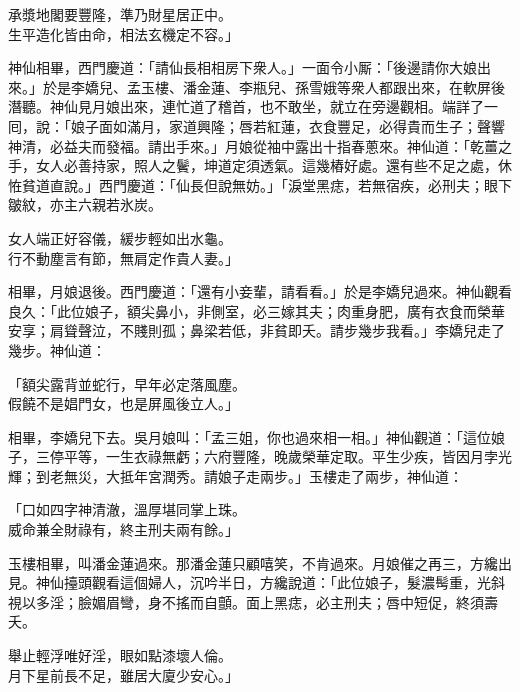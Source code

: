 \begin{myquote}
承漿地閣要豐隆，準乃財星居正中。\\生平造化皆由命，相法玄機定不容。」
\end{myquote}

神仙相畢，西門慶道：「請仙長相相房下衆人。」一面令小厮：「後邊請你大娘出來。」於是李嬌兒、孟玉樓、潘金蓮、李瓶兒、孫雪娥等衆人都跟出來，在軟屏後潛聽。神仙見月娘出來，連忙道了稽首，也不敢坐，就立在旁邊觀相。端詳了一囘，說：「娘子面如滿月，家道興隆；唇若紅蓮，衣食豐足，必得貴而生子；聲響神清，必益夫而發福。請出手來。」月娘從袖中露出十指春蔥來。神仙道：「乾薑之手，女人必善持家，照人之鬢，坤道定須透氣。這幾樁好處。還有些不足之處，休恠貧道直說。」西門慶道：「仙長但說無妨。」「淚堂黑痣，若無宿疾，必刑夫；眼下皺紋，亦主六親若氷炭。

\begin{myquote}
女人端正好容儀，緩步輕如出水龜。\\行不動塵言有節，無肩定作貴人妻。」
\end{myquote}

相畢，月娘退後。西門慶道：「還有小妾輩，請看看。」於是李嬌兒過來。神仙觀看良久：「此位娘子，額尖鼻小，非側室，必三嫁其夫；肉重身肥，廣有衣食而榮華安享；肩聳聲泣，不賤則孤；鼻梁若低，非貧即夭。{}請步幾步我看。」李嬌兒走了幾步。神仙道：

\begin{myquote}
「額尖露背並蛇行，早年必定落風塵。\\假饒不是娼門女，也是屏風後立人。」
\end{myquote}

相畢，李嬌兒下去。吳月娘叫：「孟三姐，你也過來相一相。」神仙觀道：「這位娘子，三停平等，一生衣祿無虧；六府豐隆，晚歲榮華定取。平生少疾，皆因月孛光輝；到老無災，大抵年宮潤秀。請娘子走兩步。」玉樓走了兩步，神仙道：

\begin{myquote}
「口如四字神清澈，溫厚堪同掌上珠。\\威命兼全財祿有，終主刑夫兩有餘。」
\end{myquote}

玉樓相畢，叫潘金蓮過來。那潘金蓮只顧嘻笑，不肯過來。{}月娘催之再三，方纔出見。神仙擡頭觀看這個婦人，沉吟半日，方纔說道：「此位娘子，髮濃髩重，{}光斜視以多淫；臉媚眉彎，身不搖而自顫。面上黑痣，必主刑夫；唇中短促，終須壽夭。

\begin{myquote}
舉止輕浮唯好淫，眼如點漆壞人倫。\\月下星前長不足，雖居大廈少安心。」
\end{myquote}

